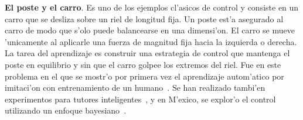 \documentclass[11pt]{article}
\begin{document}
\textbf{El poste y el carro}. Es uno de los ejemplos cl'asicos de control y consiste en un carro que se desliza sobre un riel de longitud fija. Un poste est'a asegurado al carro de modo que s'olo puede balancearse en una dimensi'on. El carro se mueve 'unicamente al aplicarle una fuerza de magnitud fija hacia la izquierda o derecha. La tarea del aprendizaje es construir una estrategia de control que mantenga el poste en equilibrio y sin que el carro golpee los extremos del riel. Fue en este problema en el que se mostr'o por primera vez el aprendizaje autom'atico por imitaci'on con entrenamiento de un humano~\cite{Michie94buildingsymbolic,Suc99skillmodelling}. Se han realizado tambi'en experimentos para tutores inteligentes~\cite{And99modellingof}, y en M'exico, se explor'o el control utilizando un enfoque bayesiano~\cite{freyre}.






\medskip
\noindent
\end{document}
